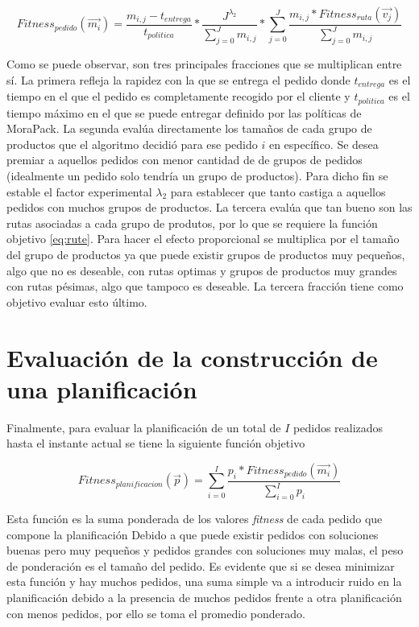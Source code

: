 \begin{equation}
    \label{eq:order}
    Fitness_{pedido}(\overrightarrow{m_i}) = \frac{m_{i,j} - t_{entrega}}{t_{politica}} * \frac{J^{\lambda_2}}{\sum_{j = 0}^{J} m_{i,j}} * \sum_{j = 0}^{J} \frac{m_{i,j} * Fitness_{ruta}(\overrightarrow{v_j})}{\sum_{j = 0}^{J} m_{i,j}}
\end{equation}

Como se puede observar, son tres principales fracciones que se multiplican entre sí. La primera refleja la rapidez con la que se entrega el pedido donde $t_{entrega}$ es el tiempo en el que el pedido es completamente recogido por el cliente y $t_{politica}$ es el tiempo máximo en el que se puede entregar definido por las políticas de MoraPack. La segunda evalúa directamente los tamaños de cada grupo de productos que el algoritmo decidió para ese pedido $i$ en específico. Se desea premiar a aquellos pedidos con menor cantidad de de grupos de pedidos (idealmente un pedido solo tendría un grupo de productos). Para dicho fin se estable el factor experimental $\lambda_2$ para establecer que tanto castiga a aquellos pedidos con muchos grupos de productos. La tercera evalúa que tan bueno son las rutas asociadas a cada grupo de produtos, por lo que se requiere la función objetivo \ref{eq:rute}. Para hacer el efecto proporcional se multiplica por el tamaño del grupo de productos ya que puede existir grupos de productos muy pequeños, algo que no es deseable, con rutas optimas y grupos de productos muy grandes con rutas pésimas, algo que tampoco es deseable. La tercera fracción tiene como objetivo evaluar esto último.

\section{Evaluación de la construcción de una planificación}

Finalmente, para evaluar la planificación de un total de $I$ pedidos realizados hasta el instante actual se tiene la siguiente función objetivo

\begin{equation}
    \label{eq:plan}
    Fitness_{planificacion}(\overrightarrow{p}) = \sum_{i = 0}^{I} \frac{p_i*Fitness_{pedido}(\overrightarrow{m_i})}{\sum_{i = 0}^{I} p_i }
\end{equation}

Esta función es la suma ponderada de los valores \textit{fitness} de cada pedido que compone la planificación Debido a que puede existir pedidos con soluciones buenas pero muy pequeños y pedidos grandes con soluciones muy malas, el peso de ponderación es el tamaño del pedido. Es evidente que si se desea minimizar esta función y hay muchos pedidos, una suma simple va a introducir ruido en la planificación debido a la presencia de muchos pedidos frente a otra planificación con menos pedidos, por ello se toma el promedio ponderado.

